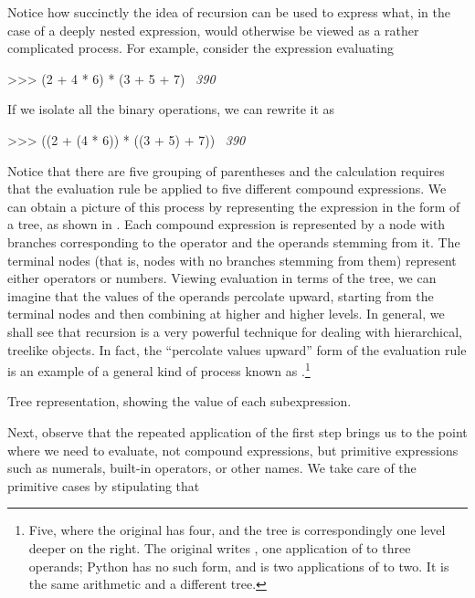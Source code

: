Notice how succinctly the idea of recursion can be used to express what, in the
case of a deeply nested expression, would otherwise be viewed as a rather
complicated process.  For example, consider the expression evaluating

\begin{codeBlock}
>>> (2 + 4 * 6) * (3 + 5 + 7)
~\textit{390}~
\end{codeBlock}

If we isolate all the binary operations, we can rewrite it as

\begin{codeBlock}
>>> ((2 + (4 * 6)) * ((3 + 5) + 7))
~\textit{390}~
\end{codeBlock}

\noindent
Notice that there are five grouping of parentheses and the calculation requires that the evaluation rule be applied to five different compound
expressions.  We can obtain a picture of this process by representing the
expression in the form of a tree, as shown in .  Each compound
expression is represented by a node with branches corresponding to the operator
and the operands stemming from it.  The terminal nodes (that is, nodes with no
branches stemming from them) represent either operators or numbers.  Viewing
evaluation in terms of the tree, we can imagine that the values of the operands
percolate upward, starting from the terminal nodes and then combining at higher
and higher levels.  In general, we shall see that recursion is a very powerful
technique for dealing with hierarchical, treelike objects.  In fact, the
``percolate values upward'' form of the evaluation rule is an example of a
general kind of process known as .\footnote{Five,
where the original has four, and the tree is correspondingly one level deeper
on the right.  The original writes , one application of
\code{+} to three operands; Python has no such form, and  is
two applications of \code{+} to two.  It is the same arithmetic and a different
tree.}

\begin{imageFigure}{Tree representation, showing the value of each
  subexpression.}
  
\end{imageFigure}

Next, observe that the repeated application of the first step brings us to the
point where we need to evaluate, not compound expressions, but primitive
expressions such as numerals, built-in operators, or other names.  We take care
of the primitive cases by stipulating that

